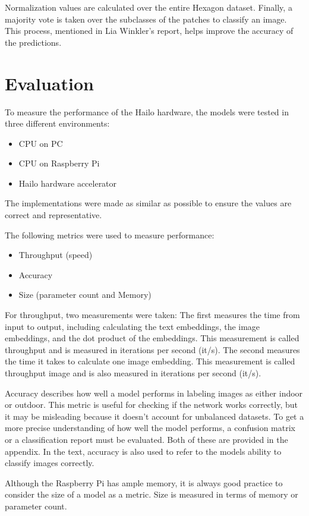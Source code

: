 Normalization values are calculated over the entire Hexagon dataset.
Finally, a majority vote is taken over the subclasses of the patches to classify an image. 
This process, mentioned in Lia Winkler's report, helps improve the accuracy of the predictions.

\section{Evaluation}

To measure the performance of the Hailo hardware, the models were tested in three different environments:
\begin{itemize}
    \item CPU on PC
    \item CPU on Raspberry Pi
    \item Hailo hardware accelerator
\end{itemize}
The implementations were made as similar as possible to ensure the values are correct and representative. 

The following metrics were used to measure performance:
\begin{itemize}
    \item Throughput (speed)
    \item Accuracy
    \item Size (parameter count and Memory)
\end{itemize}

For throughput, two measurements were taken:
The first measures the time from input to output, including calculating the text embeddings, the image embeddings, and the dot product of the embeddings. This measurement is called throughput and is measured in iterations per second (it/s).
The second measures the time it takes to calculate one image embedding. This measurement is called throughput image and is also measured in iterations per second (it/s).

Accuracy describes how well a model performs in labeling images as either indoor or outdoor. This metric is useful for checking if the network works correctly, but it may be misleading because it doesn't account for unbalanced datasets. To get a more precise understanding of how well the model performs, a confusion matrix or a classification report must be evaluated. Both of these are provided in the appendix. In the text, accuracy is also used to refer to the models ability to classify images correctly.

Although the Raspberry Pi has ample memory, it is always good practice to consider the size of a model as a metric. Size is measured in terms of memory or parameter count.

